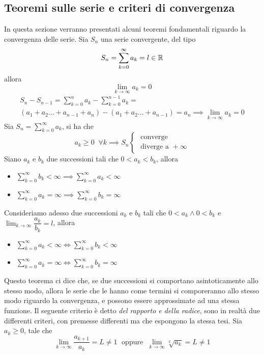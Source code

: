 \documentclass[10pt, letterpaper]{report}
\begin{document}
\subsection{Teoremi sulle serie e criteri di convergenza}
In questa sezione verranno presentati alcuni teoremi fondamentali riguardo la convergenza
delle serie. \acc
{} Sia $S_n$ una serie convergente, del tipo
$$ S_n=  \sum_{k=0}^\infty a_k = l\in {\mathbb R}$$
allora $$\lim_{k\rightarrow\infty}a_k=0$$
\dimo{}
$$\begin{matrix}
        S_n-S_{n-1}= \sum_{k=0}^n a_k-\sum_{k=0}^{n-1} a_k = \\
        (a_1+a_2\dots+ a_{n-1}+a_n)-(a_1+a_2\dots+ a_{n-1})=
        a_n \implies \lim_{k\rightarrow\infty}a_k=0
    \end{matrix} $$
Sia $S_n=  \sum_{k=0}^\infty a_k$, si ha che
$$ a_k\ge 0 \;\;\forall k\implies S_n \begin{cases}
        \text{ converge} \\
        \text{ diverge a }+\infty
    \end{cases}$$
 Siano $a_k$ e $b_k$ due successioni tali che $0<a_k<b_k$, allora\begin{itemize}
    \item $ \sum_{k=0}^\infty b_k<\infty \implies \sum_{k=0}^\infty a_k<\infty$
    \item $ \sum_{k=0}^\infty a_k=\infty \implies \sum_{k=0}^\infty b_k=\infty$
\end{itemize}
Consideriamo adesso due successioni  $a_k$ e $b_k$ tali che $0<a_k \land 0<b_k$ e
$\displaystyle \lim_{k\rightarrow \infty}\dfrac{a_k}{b_k}=l$, allora \begin{itemize}
    \item $ \sum_{k=0}^\infty a_k<\infty \iff \sum_{k=0}^\infty b_k<\infty$
    \item $ \sum_{k=0}^\infty a_k=\infty \iff \sum_{k=0}^\infty b_k=\infty$
\end{itemize}
Questo teorema ci dice che, se due successioni si comportano asintoticamente allo stesso modo,
allora le serie che le hanno come termini si comporeranno allo stesso modo riguardo
la convergenza, e possono essere approssimate ad una stessa funzione.\acc
Il seguente criterio è detto \textit{del rapporto e della radice}, sono in realtà
due differenti criteri, con premesse differenti ma che espongono la stessa tesi. Sia
$a_k\ge 0$, tale che
$$ \lim_{k\rightarrow \infty} \dfrac{a_{k+1}}{a_k}= L\ne 1 \;\text{ oppure }\;
    \lim_{k\rightarrow \infty} \sqrt[k]{a_k}= L\ne 1$$
\end{document}
